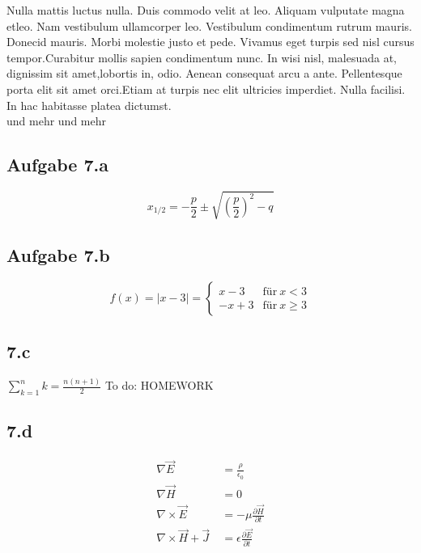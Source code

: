 \documentclass[11pt,
               a4paper,
               parskip=half,
               ]{scrartcl}
\newcommand {\ToDo }[1]{{\color{red}To do: #1}}
\begin{document}
 Nulla mattis luctus nulla. Duis commodo velit at leo. Aliquam vulputate magna etleo. Nam vestibulum ullamcorper leo. Vestibulum condimentum rutrum mauris. Donecid mauris. Morbi molestie justo et pede. Vivamus eget turpis sed nisl cursus tempor.Curabitur mollis sapien condimentum nunc. In wisi nisl, malesuada at, dignissim sit amet,lobortis in, odio. Aenean consequat arcu a ante. Pellentesque porta elit sit amet orci.Etiam at turpis nec elit ultricies imperdiet. Nulla facilisi. In hac habitasse platea dictumst.\\
 
 und mehr und mehr
\cite{largest}
\newpage

\subsection{Aufgabe 7.a}

\begin{equation}
    x_{1/2} = -\frac{p}{2} \pm \sqrt{\left(\frac{p}{2}\right)^2 - q}
\end{equation}

\subsection{Aufgabe 7.b}

\begin{equation*}
    f(x) = |x - 3| =
    \begin{cases} x - 3 & \text{für}\ x < 3\\
    -x + 3 & \text{für}\  x \geq 3
    \end{cases}
\end{equation*}

\subsection{7.c}
\begin{math}
    \sum_{k=1}^n k = \frac{n(n+1)}{2}
\end{math}
\ToDo{HOMEWORK}
\subsection{7.d}

\begin{align}
    \nabla\vec{E}\ & = \frac{\rho}{\epsilon_0}\\
    \nabla\vec{H}\ & = 0\\
    \nabla \times \vec{E}\ & = -\mu \frac{\partial \vec{H}}{\partial t}\nonumber\\
    \nabla \times \vec{H} + \vec{J}\ & = \epsilon\frac{\partial \vec{E}}{\partial t}
    \end{align}
\end{document}
